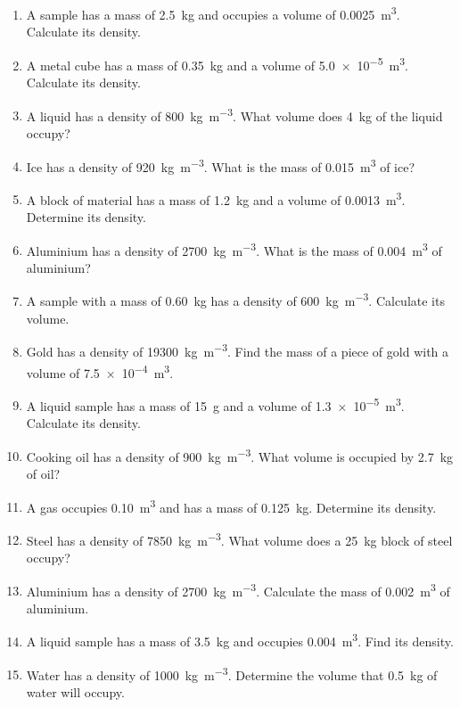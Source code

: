 \documentclass[11pt]{article}
\begin{document}
\begin{enumerate}
\item A sample has a mass of \SI{2.5}{\kilogram} and occupies a volume of \SI{0.0025}{\metre\cubed}. Calculate its density.
\item A metal cube has a mass of \SI{0.35}{\kilogram} and a volume of \SI{5.0e-5}{\metre\cubed}. Calculate its density.
\item A liquid has a density of \SI{800}{\kilogram\per\metre\cubed}. What volume does \SI{4}{\kilogram} of the liquid occupy?
\item Ice has a density of \SI{920}{\kilogram\per\metre\cubed}. What is the mass of \SI{0.015}{\metre\cubed} of ice?
\item A block of material has a mass of \SI{1.2}{\kilogram} and a volume of \SI{0.0013}{\metre\cubed}. Determine its density.
\item Aluminium has a density of \SI{2700}{\kilogram\per\metre\cubed}. What is the mass of \SI{0.004}{\metre\cubed} of aluminium?
\item A sample with a mass of \SI{0.60}{\kilogram} has a density of \SI{600}{\kilogram\per\metre\cubed}. Calculate its volume.
\item Gold has a density of \SI{19300}{\kilogram\per\metre\cubed}. Find the mass of a piece of gold with a volume of \SI{7.5e-4}{\metre\cubed}.
\item A liquid sample has a mass of \SI{15}{\gram} and a volume of \SI{1.3e-5}{\metre\cubed}. Calculate its density.
\item Cooking oil has a density of \SI{900}{\kilogram\per\metre\cubed}. What volume is occupied by \SI{2.7}{\kilogram} of oil?
\item A gas occupies \SI{0.10}{\metre\cubed} and has a mass of \SI{0.125}{\kilogram}. Determine its density.
\item Steel has a density of \SI{7850}{\kilogram\per\metre\cubed}. What volume does a \SI{25}{\kilogram} block of steel occupy?
\item Aluminium has a density of \SI{2700}{\kilogram\per\metre\cubed}. Calculate the mass of \SI{0.002}{\metre\cubed} of aluminium.
\item A liquid sample has a mass of \SI{3.5}{\kilogram} and occupies \SI{0.004}{\metre\cubed}. Find its density.
\item Water has a density of \SI{1000}{\kilogram\per\metre\cubed}. Determine the volume that \SI{0.5}{\kilogram} of water will occupy.


\end{enumerate}
\end{document}
